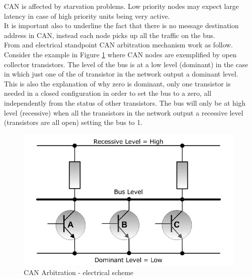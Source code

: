 \documentclass[../main.tex]{subfiles}
\begin{document}
\gls{CAN} is affected by starvation problems. Low priority nodes may expect large latency in case of high priority units being very active. \\
It is important also to underline the fact that there is no message destination address in \gls{CAN}, instead each node picks up all the traffic on the bus.\\
From and electrical standpoint \gls{CAN} arbitration mechanism work as follow. Consider the example in Figure   \ref{fig:CANABRELT} where \gls{CAN} nodes are exemplified by open collector transistors. 
The level of the bus is at a low level (dominant) in the case in which just one of the of transistor in the network output a dominant level. This is also the explanation of why zero is dominant, only one transistor is needed in a closed configuration in order to set the \gls{bus} to a zero, all independently from the status of other transistors. The \gls{bus} will only be at high level (recessive) when all the transistors in the network output a recessive level (transistors are all open) setting the \gls{bus} to 1.
\begin{figure}[ht]
    \centering
    \includegraphics[width=0.7\linewidth]{images_folder/controller-area-network-can-bus-bus-arbitration-3.jpg}
    \caption{CAN Arbitration -  electrical scheme}
    \label{fig:CANABRELT}
\end{figure}



\cleardoublepage
\end{document}
